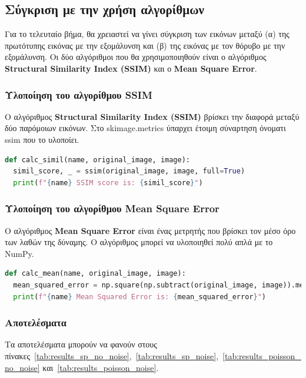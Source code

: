 \subsection{Σύγκριση με την χρήση αλγορίθμων}

Για το τελευταίο βήμα, θα χρειαστεί να γίνει σύγκριση των εικόνων μεταξύ (α) της πρωτότυπης εικόνας με την εξομάλυνση και (β) της εικόνας με τον θόρυβο με την εξομάλυνση.
Οι δύο αλγόριθμοι που θα χρησιμοποιηθούν είναι ο αλγόριθμος \textbf{Structural Similarity Index (SSIM)} και ο \textbf{Mean Square Error}.

\subsubsection{Υλοποίηση του αλγορίθμου SSIM}

Ο αλγόριθμος \textbf{Structural Similarity Index (SSIM)} βρίσκει την διαφορά μεταξύ δύο παρόμοιων εικόνων. Στο skimage.metrics ύπαρχει έτοιμη σύναρτηση όνοματι ssim που το υλοποίει.

\begin{lstlisting}[language=Python, caption=SSIM Algorithm]
def calc_simil(name, original_image, image):
  simil_score, _ = ssim(original_image, image, full=True)
  print(f"{name} SSIM score is: {simil_score}")
\end{lstlisting}

\subsubsection{Υλοποίηση του αλγορίθμου Mean Square Error}

Ο αλγόριθμος \textbf{Mean Square Error} είναι ένας μετρητής που βρίσκει τον μέσο όρο των λαθών της δύναμης. Ο αλγόριθμος μπορεί να υλοποιηθεί πολύ απλά με το NumPy.

\begin{lstlisting}[language=Python, caption=Mean Squared Error Algorithm]
def calc_mean(name, original_image, image):
  mean_squared_error = np.square(np.subtract(original_image, image)).mean()
  print(f"{name} Mean Squared Error is: {mean_squared_error}")
\end{lstlisting}

\newpage
\subsubsection{Αποτελέσματα}

Τα αποτελέσματα μπορούν να φανούν στους πίνακες~\ref{tab:results_sp_no_noise},~\ref{tab:results_sp_noise},~\ref{tab:results_poisson_no_noise} και~\ref{tab:results_poisson_noise}.

